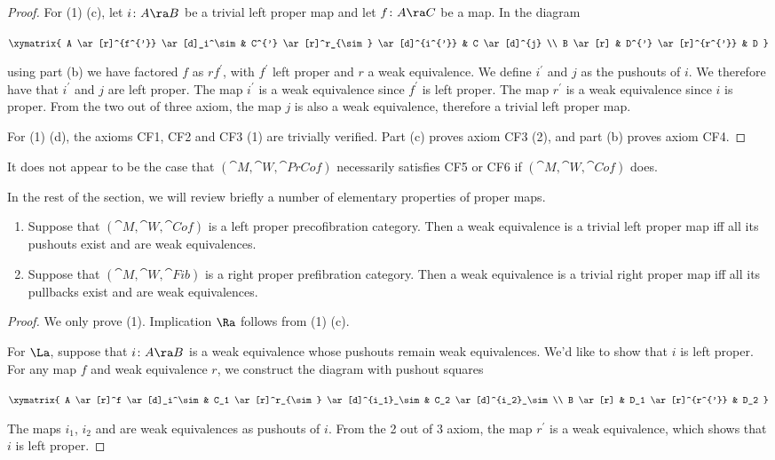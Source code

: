 \begin{proof}
For (1) (c), let $i \colon A \ra B$ be a trivial left proper map and let $f \colon A \ra C$ be a map. In the diagram
\begin{center}
$\xymatrix {
    A \ar[r]^{f^{'}} \ar[d]_i^\sim & C^{'} \ar[r]^r_{\sim} \ar[d]^{i^{'}} & C \ar[d]^{j} \\
    B \ar[r] & D^{'} \ar[r]^{r^{'}} & D
  }$
\end{center}
using part (b) we have factored $f$ as $rf^{'}$, with $f^{'}$ left proper and $r$ a weak equivalence. We define $i^{'}$ and $j$ as the pushouts of $i$. We therefore have that $i^{'}$ and $j$ are left proper. The map $i^{'}$ is a weak equivalence since $f^{'}$ is left proper. The map $r^{'}$ is a weak equivalence since $i$ is proper. From the two out of three axiom, the map $j$ is also a weak equivalence, therefore a trivial left proper map.

For (1) (d), the axioms CF1, CF2 and CF3 (1) are trivially verified. Part (c) proves axiom CF3 (2), and part (b) proves axiom CF4.
\end{proof}

It does not appear to be the case that $({\cat M}, {\cat W}, {\cat PrCof})$ necessarily satisfies CF5 or CF6 if $({\cat M}, {\cat W}, {\cat Cof})$ does.

In the rest of the section, we will review briefly a number of elementary properties of proper maps.

\begin{prop}
\label{prop:propermaps1}
\mbox{}
\begin{enumerate}
\item
Suppose that $({\cat M}, {\cat W}, {\cat Cof})$ is a left proper precofibration category. Then a weak equivalence is a trivial left proper map iff all its pushouts exist and are weak equivalences.
\item
Suppose that $({\cat M}, {\cat W}, {\cat Fib})$ is a right proper prefibration category. Then a weak equivalence is a trivial right proper map iff all its pullbacks exist and are weak equivalences.
\end{enumerate}
\end{prop}

\begin{proof}
We only prove (1). Implication $\Ra$ follows from  (1) (c). 

For $\La$, suppose that $i \colon A \ra B$ is a weak equivalence whose pushouts remain weak equivalences. We'd like to show that $i$ is left proper. For any map $f$ and weak equivalence $r$, we construct the diagram with pushout squares
\begin{center}
$\xymatrix {
    A \ar[r]^f \ar[d]_i^\sim & C_1 \ar[r]^r_{\sim} \ar[d]^{i_1}_\sim & C_2 \ar[d]^{i_2}_\sim \\
    B \ar[r] & D_1 \ar[r]^{r^{'}} & D_2
  }$
\end{center}
The maps $i_1$, $i_2$ and are weak equivalences as pushouts of $i$. From the 2 out of 3 axiom, the map $r^{'}$ is a weak equivalence, which shows that $i$ is left proper.
\end{proof}

